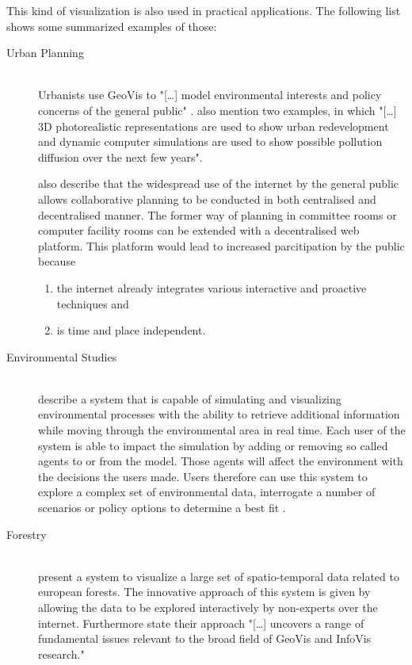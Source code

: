 This kind of visualization is also used in practical applications. The following list shows some summarized examples of those:
\begin{description}

\item[Urban Planning] \hfill \\
Urbanists use \ac{GeoVis} to "[\ldots] model environmental interests and policy concerns of the general public" . \citeauthor{Jiang2003} also mention two examples, in which "[\ldots] 3D photorealistic representations are used to show urban redevelopment and dynamic computer simulations are used to show possible pollution diffusion over the next few years".

\citeauthor{Jiang2003} also describe that the widespread use of the internet by the general public allows collaborative planning to be conducted in both centralised and decentralised manner. The former way of planning in committee rooms or computer facility rooms can be extended with a decentralised web platform. This platform would lead to increased parcitipation by the public because
\begin{enumerate}
\item the internet already integrates various interactive and proactive techniques and
\item is time and place independent.
\end{enumerate}

\item[Environmental Studies] \hfill \\
\citeauthor{Danado2005} describe a system that is capable of simulating and visualizing environmental processes with the ability to retrieve additional information while moving through the environmental area in real time. Each user of the system is able to impact the simulation by adding or removing so called agents to or from the model. Those agents will affect the environment with the decisions the users made. Users therefore can use this system to explore a complex set of environmental data, interrogate a number of scenarios or policy options to determine a best fit .

\item[Forestry] \hfill \\
\citeauthor{Andrienko2007} present a system to visualize a large set of spatio-temporal data related to european forests. The innovative approach of this system is given by allowing the data to be explored interactively by non-experts over the internet. Furthermore \citeauthor{Andrienko2007} state their approach "[\ldots] uncovers a range of fundamental issues relevant to the broad field of \ac{GeoVis} and \ac{InfoVis} research."


\end{description}
